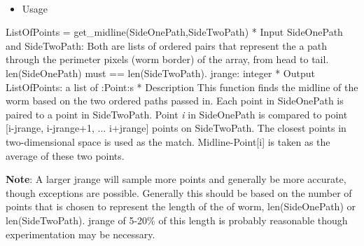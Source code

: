 \documentclass[letterpaper,10pt,oneside]{sphinxmanual}
\begin{document}
\begin{fulllineitems}
\label{index:libcelegans.get_side_paths}~\begin{itemize}
\item {} 
Usage

\end{itemize}

ListOfPoints = get\_midline(SideOnePath,SideTwoPath)
* Input
SideOnePath and SideTwoPath: Both are lists of ordered pairs that represent the 
a path through the perimeter pixels (worm border) of the array, from head to tail.  
len(SideOnePath) must == len(SideTwoPath).
jrange: integer
* Output
ListOfPoints:  a list of :Point:s
* Description
This function finds the midline of the worm based on the two ordered paths
passed in.  Each point in SideOnePath is paired to a point in SideTwoPath.  
Point \emph{i} in SideOnePath is compared to point {[}i-jrange, i-jrange+1, ... i+jrange{]}
points on SideTwoPath.  The closest points in two-dimensional space is used as the
match.  Midline-Point{[}i{]} is taken as the average of these two points.

\textbf{Note}:  A larger jrange will sample more points and generally be more accurate,
though exceptions are possible.  Generally this should be based on the number of points
that is chosen to represent the length of the of worm, len(SideOnePath) or 
len(SideTwoPath).  jrange of 5-20\% of this length is probably reasonable though experimentation
may be necessary.

\end{fulllineitems}

\end{document}
